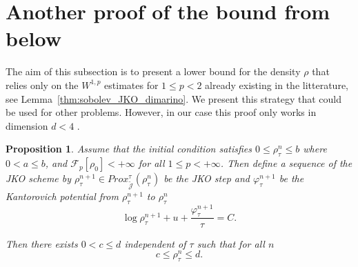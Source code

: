 \documentclass[a4paper,twosided, 11pt]{article}
\newcommand {\f}   {\frac}
\theoremstyle{plain}
\newtheorem{proposition}[thm]{Proposition}
\theoremstyle{remark}
\numberwithin{equation}{section}
\begin{document}
\iffalse

\appendix 
\section{Another proof of the bound from below}

The aim of this subsection is to present a lower bound for the density $\rho$ that relies only on the $W^{1,p}$ estimates for $1\le p<2$ already existing in the litterature, see Lemma~\ref{thm:sobolev_JKO_dimarino}. We present this strategy that could be used for other problems. However, in our case this proof only works in dimension $d<4$ .

\begin{proposition}
Assume that the initial condition satisfies $0\le \rho_{\tau}^{n}\le b$ where $0<a\le b$, and $\mathcal{F}_{p}[\rho_{0}]<+\infty$ for all $1\le p<+\infty$. Then define a sequence of the JKO scheme by  $\rho^{n+1}_{\tau}\in Prox_{\widetilde{\mathcal{J}}}^{\tau}(\rho^{n}_{\tau})$ be the JKO step and $\varphi^{n+1}_{\tau}$ be the Kantorovich potential from $\rho^{n+1}_{\tau}$ to $\rho^{n}_{\tau}$
\begin{equation}\label{eq:appendix}
\log\rho^{n+1}_{\tau} + u + \f{\varphi^{n+1}_{\tau}}{\tau}=C.
\end{equation}

Then there exists $0<c\le d$ independent of $\tau$ such that for all $n$
$$
c\le \rho^{n}_{\tau}\le d.
$$
\end{proposition}
\end{document}
